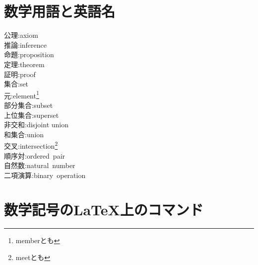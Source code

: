 \documentclass[hyperref,a4paper,12pt]{kininaruki}
\begin{document}
\section{数学用語と英語名}
\begin{multicols*}{3}
\noindent
\hypertarget{axiom}{公理}:axiom\\
\hypertarget{inference}{推論}:inference\\
\hypertarget{proposition}{命題}:proposition\\
\hypertarget{theorem}{定理}:theorem\\
\hypertarget{proof}{証明}:proof\\
\hypertarget{set}{集合}:set\\
\hypertarget{member}{元}:element\footnote{memberとも}\\
\hypertarget{subset}{部分集合}:subset\\
\hypertarget{superset}{上位集合}:superset\\
\hypertarget{dunion}{非交和}:disjoint union\\
\hypertarget{union}{和集合}:union\\
\hypertarget{intersection}{交叉}:intersection\footnote{meetとも}\\
\hypertarget{ordpair}{順序対}:ordered\, pair\\
\hypertarget{natural}{自然数}:natural\, number\\
\hypertarget{bioperation}{二項演算}:binary\, operation\\
\end{multicols*}
\newpage
\section{数学記号のLaTeX上のコマンド}
\newpage
{} {}
\printindex
\end{document}
